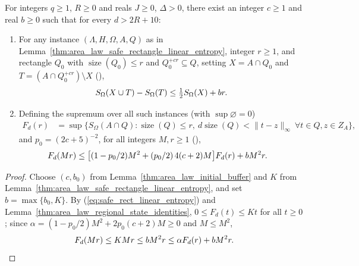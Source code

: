 \begin{lemma}
    \label{thm:area_law_real_box_recurrence_after_area_law}
    \leanok
    For integers $q\ge1$, $R\ge0$ and reals $J\ge0$, $\Delta>0$, there exist an integer $c\ge1$ and real $b\ge0$ such that for every $d>2R+10$:
    \begin{enumerate}
        \item For any instance $(\Lambda,H,\Omega,A,Q)$ as in Lemma~\ref{thm:area_law_safe_rectangle_linear_entropy}, integer $r\ge1$, and rectangle $Q_0$ with $\operatorname{size}(Q_0)\le r$ and $Q_0^{+cr}\subseteq Q$, setting $X=A\cap Q_0$ and $T=(A\cap Q_0^{+cr})\setminus X$ (\cite[Lemma~3.2]{OpenAI2026AreaLaw}),
              \begin{align}
                  S_\Omega(X\cup T)-S_\Omega(T)
                  \le\tfrac12S_\Omega(X)+br.\notag
              \end{align}
        \item Defining the supremum over all such instances (with $\sup\varnothing=0$)
              \begin{align}
                  F_d(r) & =\sup\bigl\{S_\Omega(A\cap Q):
                  \operatorname{size}(Q)\le r,\ d\operatorname{size}(Q)<\|t-z\|_\infty
                  \ \forall t\in Q,z\in Z_A\bigr\}, \label{eq:Fd_def}
              \end{align}
              and $p_0=(2c+5)^{-2}$, for all integers $M,r\ge1$ (\cite[Proposition~3.3]{OpenAI2026AreaLaw}),
              \begin{align}
                  F_d(Mr)
                   & \le\bigl[(1-p_0/2)M^2+(p_0/2)\,4(c+2)M\bigr]F_d(r)
                  +bM^2r.\notag
              \end{align}
    \end{enumerate}
\end{lemma}
\begin{proof}\leanok
    Choose $(c,b_0)$ from Lemma~\ref{thm:area_law_initial_buffer} and $K$ from Lemma~\ref{thm:area_law_safe_rectangle_linear_entropy}, and set $b=\max\{b_0,K\}$.
    By (\ref{eq:safe_rect_linear_entropy}) and Lemma~\ref{thm:area_law_regional_state_identities}, $0\le F_d(t)\le Kt$ for all $t\ge0$; since $\alpha=(1-p_0/2)M^2+2p_0(c+2)M\ge0$ and $M\le M^2$,
    \begin{align}
        F_d(Mr)\le KMr\le bM^2r \le\alpha F_d(r)+bM^2r.\notag
    \end{align}
\end{proof}
